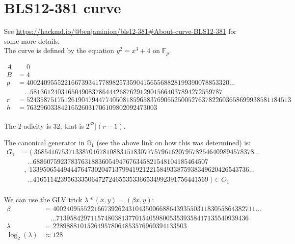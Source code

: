 \documentclass[12pt,draft,a4paper,openany,oneside]{amsbook}
\def\F{\mathbb{F}}
\def\G{\mathbb{G}}
\theoremstyle{plain}
\theoremstyle{definition}
\begin{document}
\section{BLS12-381 curve}

See \url{https://hackmd.io/@benjaminion/bls12-381#About-curve-BLS12-381} for 
some more details.\\

The curve is defined by the equation $y^2 = x^3 + 4$ on $\F_p$.

\begin{align*}
A &= 0 \\
B &= 4 \\
p &= 40024095552216673934177898257359041565568828199390078853320 \dots \\
  &\quad   \dots 58136124031650490837864442687629129015664037894272559787 \\ 
r &= 52435875175126190479447740508185965837690552500527637822603658699938581184513 \\
h &= 76329603384216526031706109802092473003 \\
\end{align*}

The 2-adicity is 32, that is $2^{32} | (r-1)$. 

The canonical generator in $\G_1$ (see the above link on how this was determined) is:
\begin{align*}
G_1 &= (\;3685416753713387016781088315183077757961620795782546409894578378\dots \\
    &   \quad\dots 688607592378376318836054947676345821548104185464507  \\ 
    &\;\;  ,\;1339506544944476473020471379941921221584933875938349620426543736\dots \\
    &   \quad\dots 416511423956333506472724655353366534992391756441569\;) \in G_1\\
\end{align*}

We can use the GLV trick $\lambda*(x,y)=(\beta x,y)$:
\begin{align*}
\beta &= 40024095552216673926243104350066886439355031183055864382711 \dots \\
      &\quad \dots 71395842971157480381377015405980053539358417135540939436\\
\lambda &= 228988810152649578064853576960394133503 \\
\log_2(\lambda) &\approx 128 \\
\end{align*}


\end{document}
